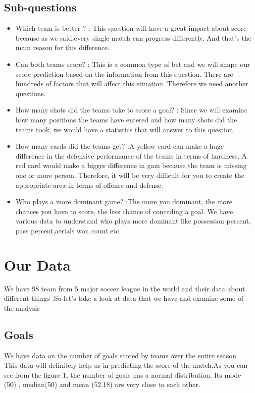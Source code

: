 \documentclass[conference]{IEEEtran}
\begin{document}
\subsection{Sub-questions}
\begin{itemize}
\item Which team is better ? : This question will have a great impact about score because as we said,every single match can progress differently. And that's 
the main reason for this difference.
\item Can both teams score? : This is a common type of bet and we will shape our score prediction based on the information from this question. There are hundreds of factors that will affect this situation. Therefore we need another questions.
\item How many shots did the teams take to score a goal? : 	Since we will examine how many positions the teams have entered and how many shots did the
teams took, we would have a statistics that will answer to this question.
\item How many cards did the teams get? :A yellow card can make a huge difference in the defensive performance of the teams in terms of hardness. A red card 
would make a bigger difference in gam because the team is missing one or more person. Therefore, it will be very difficult for you to create the appropriate area in terms of offense and defense.
\item Who plays a more dominant game? :The more you dominant, the more chances you have to score, the less chance of conceding a goal. We have various data to understand who plays more dominant like possession percent, pass percent,aerials won count etc.
\end{itemize}

\section{Our Data}
We have 98 team from 5 major soccer league in the world and their data about different things .So let's take a look at data that we have and examine some of the analysis

\subsection{Goals}
We have data on the number of goals scored by teams over the entire season. This data will definitely help us in predicting the score of the match.As you can see from the figure 1, the number of goals has a normal distribution. Its mode (50) , median(50)  and mean (52.18)  are very close to each other.
\end{document}
